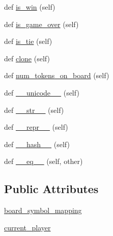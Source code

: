 \begin{DoxyCompactItemize}
\item 
def \hyperlink{classconnectfour_1_1_connect_four_board_a69769c7825f546e9e9fe5af60ef6ebac}{is\+\_\+win} (self)
\item 
def \hyperlink{classconnectfour_1_1_connect_four_board_a3dccbfa0b2b9e1cb64306964edf46776}{is\+\_\+game\+\_\+over} (self)
\item 
def \hyperlink{classconnectfour_1_1_connect_four_board_aa56fe0b1b07f9995e4b0bec934317a62}{is\+\_\+tie} (self)
\item 
def \hyperlink{classconnectfour_1_1_connect_four_board_a4f2aed3f3fd565ef5508a448b5a28ecc}{clone} (self)
\item 
def \hyperlink{classconnectfour_1_1_connect_four_board_a28425f26b3b7d7857d90a01c9ebe99d7}{num\+\_\+tokens\+\_\+on\+\_\+board} (self)
\item 
def \hyperlink{classconnectfour_1_1_connect_four_board_a79db4f932dab894e733e9d7783e1912b}{\+\_\+\+\_\+unicode\+\_\+\+\_\+} (self)
\item 
def \hyperlink{classconnectfour_1_1_connect_four_board_a5d864ec8577e93d795d2652fdb36105c}{\+\_\+\+\_\+str\+\_\+\+\_\+} (self)
\item 
def \hyperlink{classconnectfour_1_1_connect_four_board_a21aac38964cad4976cdb926e96090b2b}{\+\_\+\+\_\+repr\+\_\+\+\_\+} (self)
\item 
def \hyperlink{classconnectfour_1_1_connect_four_board_ae5b30e0abc85657a97edf8efa1818d9c}{\+\_\+\+\_\+hash\+\_\+\+\_\+} (self)
\item 
def \hyperlink{classconnectfour_1_1_connect_four_board_ac14002ce00eb4b9f764237dea5c14a39}{\+\_\+\+\_\+eq\+\_\+\+\_\+} (self, other)
\end{DoxyCompactItemize}
\subsection*{Public Attributes}
\begin{DoxyCompactItemize}
\item 
\hyperlink{classconnectfour_1_1_connect_four_board_ae28d1dac88e83fb944b018976f719cef}{board\+\_\+symbol\+\_\+mapping}
\item 
\hyperlink{classconnectfour_1_1_connect_four_board_a9fe155eb44056df0fe1ca6c0cbcd69d3}{current\+\_\+player}
\end{DoxyCompactItemize}
